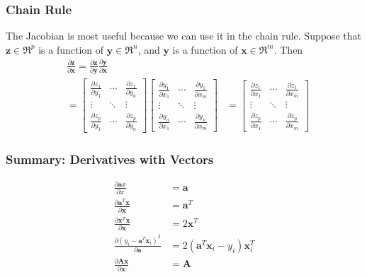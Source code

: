 \documentclass{beamer}
\begin{document}
\begin{frame}
  \frametitle{Chain Rule}

  The Jacobian is most useful because we can use it in the chain rule.
  Suppose that $\mathbf{z}\in\Re^p$ is a function of
  $\mathbf{y}\in\Re^n$, and $\mathbf{y}$ is a function of
  $\mathbf{x}\in\Re^m$.  Then
  \begin{align*}
    &\frac{\partial\mathbf{z}}{\partial\mathbf{x}}=
    \frac{\partial\mathbf{z}}{\partial\mathbf{y}}
    \frac{\partial\mathbf{y}}{\partial\mathbf{x}}\\
    &=
    \left[\begin{array}{ccc}
        \frac{\partial z_1}{\partial y_1} & \cdots & \frac{\partial z_1}{\partial y_n}\\
        \vdots&\ddots&\vdots\\
        \frac{\partial z_p}{\partial y_1} & \cdots & \frac{\partial z_p}{\partial y_n}
      \end{array}\right]
    \left[\begin{array}{ccc}
        \frac{\partial y_1}{\partial x_1} & \cdots & \frac{\partial y_1}{\partial x_m}\\
        \vdots&\ddots&\vdots\\
        \frac{\partial y_n}{\partial x_1} & \cdots & \frac{\partial y_n}{\partial x_m}
      \end{array}\right]
    &=
    \left[\begin{array}{ccc}
        \frac{\partial z_1}{\partial x_1} & \cdots & \frac{\partial z_1}{\partial x_m}\\
        \vdots&\ddots&\vdots\\
        \frac{\partial z_p}{\partial x_1} & \cdots & \frac{\partial z_p}{\partial x_m}
      \end{array}\right]
  \end{align*}
        
\end{frame}

\begin{frame}
  \frametitle{Summary: Derivatives with Vectors}
  \begin{align*}
    \frac{\partial\mathbf{a}x}{\partial x} &= \mathbf{a}\\
    \frac{\partial\mathbf{a}^T\mathbf{x}}{\partial\mathbf{x}} &= \mathbf{a}^T\\
    \frac{\partial\mathbf{x}^T\mathbf{x}}{\partial\mathbf{x}} &= 2\mathbf{x}^T\\
    \frac{\partial(y_i-\mathbf{a}^T\mathbf{x}_i)^2}{\partial\mathbf{a}}
    &= 2(\mathbf{a}^T\mathbf{x}_i-y_i)\mathbf{x}_i^T\\
    \frac{\partial\mathbf{A}\mathbf{x}}{\partial\mathbf{x}}&= \mathbf{A}
  \end{align*}    
\end{frame}
\end{document}
